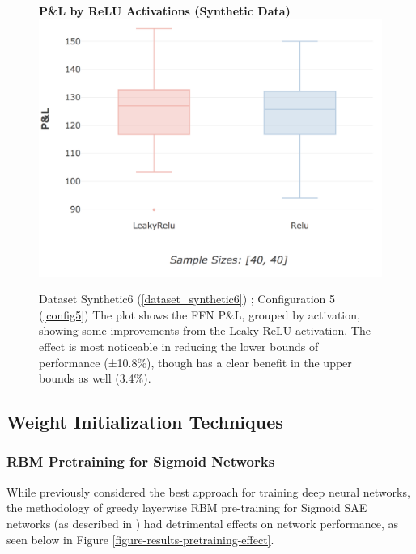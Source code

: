 \documentclass[a4paper,11pt,oneside]{article}
\theoremstyle{plain}
\theoremstyle{definition}
\begin{document}
\begin{figure}[H]
	\textbf{P\&L by ReLU Activations (Synthetic Data)}
	\centering
	\includegraphics[scale=0.3]{images/results/activations/synthetic_pl_leakyrelu.png}
	\caption[P\&L by ReLU Activations (Synthetic Data)]{Dataset Synthetic6  (\ref{dataset_synthetic6}) ; Configuration 5 (\ref{config5})
		\newline The plot shows the FFN P\&L, grouped by activation, showing some improvements from the Leaky ReLU activation. The effect is most noticeable in reducing the lower bounds of performance (±10.8\%), though has a clear benefit in the upper bounds as well (3.4\%).}
	\label{figure-synthetic_pl_leakyrelu}
\end{figure}

\newpage
\subsection{Weight Initialization Techniques}\label{results_init}

\subsubsection{RBM Pretraining for Sigmoid Networks}

While previously considered the best approach for training deep neural networks, the methodology of greedy layerwise RBM pre-training for Sigmoid SAE networks (as described in \cite{Hinton2}) had detrimental effects on network performance, as seen below in Figure \ref{figure-results-pretraining-effect}. \newline
\end{document}
